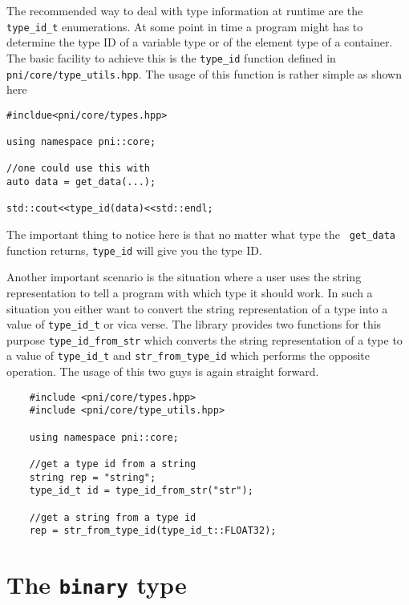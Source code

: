 The recommended way to deal with type information at runtime are the
\texttt{type\_id\_t} enumerations.
At some point in time a program might has to determine the type ID of a variable
type or of the element type of a container.  The basic facility to achieve this
is the \texttt{type\_id} function defined in \texttt{pni/core/type\_utils.hpp}.  The
usage of this function is rather simple as shown here
\begin{verbatim}
#incldue<pni/core/types.hpp>

using namespace pni::core;

//one could use this with 
auto data = get_data(...);

std::cout<<type_id(data)<<std::endl;
\end{verbatim}
The important thing to notice here is that no matter what type the \texttt{
get\_data} function returns, \texttt{type\_id} will give you the type ID.

Another important scenario is the situation where a user uses the string
representation to tell a program with which type it should work. 
In such a situation you either want to convert the string representation of a
type into a value of \texttt{type\_id\_t} or vica verse. The library provides two
functions for this purpose \texttt{type\_id\_from\_str} which converts the string
representation of a type to a value of \texttt{type\_id\_t} and 
\texttt{str\_from\_type\_id} which performs the opposite operation. 
The usage of this two guys is again straight forward.
\begin{verbatim}
    #include <pni/core/types.hpp>
    #include <pni/core/type_utils.hpp>

    using namespace pni::core;

    //get a type id from a string
    string rep = "string";
    type_id_t id = type_id_from_str("str");

    //get a string from a type id
    rep = str_from_type_id(type_id_t::FLOAT32);
\end{verbatim}


\section{The \texttt{binary} type}\label{section:using_binary}

